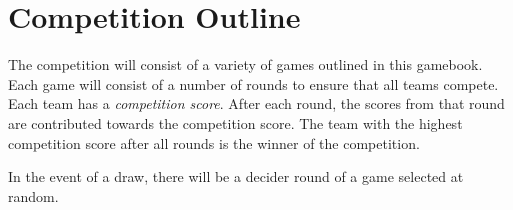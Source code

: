 \section {Competition Outline}

The competition will consist of a variety of games outlined in this gamebook. Each game will consist of a number of rounds to ensure that all teams compete. Each team has a \emph{competition score}. After each round, the scores from that round are contributed towards the competition score. The team with the highest competition score after all rounds is the winner of the competition.

In the event of a draw, there will be a decider round of a game selected at random.